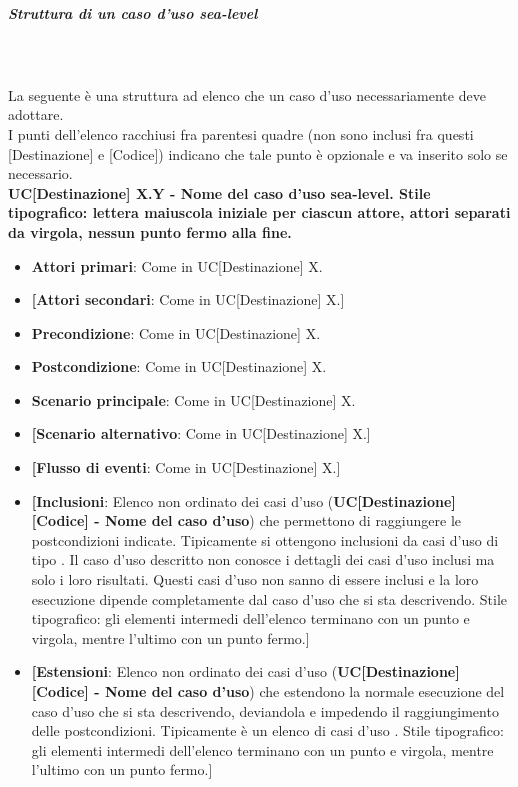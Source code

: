 \subparagraph*{Struttura di un caso d'uso sea-level}\mbox{}\\ \\
La seguente è una struttura ad elenco che un caso d'uso  necessariamente deve adottare.\\
I punti dell'elenco racchiusi fra parentesi quadre (non sono inclusi fra questi [Destinazione] e [Codice]) indicano che tale punto è opzionale e va inserito solo se necessario.\\
\textbf{UC[Destinazione] X.Y - Nome del caso d'uso sea-level. Stile tipografico: lettera maiuscola iniziale per ciascun attore, attori separati da virgola, nessun punto fermo alla fine.}%
\begin{itemize}
	\item \textbf{Attori primari}: Come in UC[Destinazione] X.
	\item \textbf{[Attori secondari}: Come in UC[Destinazione] X.]
	\item \textbf{Precondizione}: Come in UC[Destinazione] X.
	\item \textbf{Postcondizione}: Come in UC[Destinazione] X.
	\item \textbf{Scenario principale}: Come in UC[Destinazione] X.
	\item \textbf{[Scenario alternativo}: Come in UC[Destinazione] X.]
	\item \textbf{[Flusso di eventi}: Come in UC[Destinazione] X.]
	\item \textbf{[Inclusioni}: Elenco non ordinato dei casi d'uso (\textbf{UC[Destinazione] [Codice] - Nome del caso d'uso}) che permettono di raggiungere le postcondizioni indicate.
	Tipicamente si ottengono inclusioni da casi d'uso di tipo .
	Il caso d'uso descritto non conosce i dettagli dei casi d'uso inclusi ma solo i loro risultati.
	Questi casi d'uso non sanno di essere inclusi e la loro esecuzione dipende completamente dal caso d'uso che si sta descrivendo.
	Stile tipografico: gli elementi intermedi dell'elenco terminano con un punto e virgola, mentre l'ultimo con un punto fermo.]
	\item \textbf{[Estensioni}: Elenco non ordinato dei casi d'uso (\textbf{UC[Destinazione] [Codice] - Nome del caso d'uso}) che estendono la normale esecuzione del caso d'uso che si sta descrivendo, deviandola e impedendo il raggiungimento delle postcondizioni.
	Tipicamente è un elenco di casi d'uso .
	Stile tipografico: gli elementi intermedi dell'elenco terminano con un punto e virgola, mentre l'ultimo con un punto fermo.]
\end{itemize}

